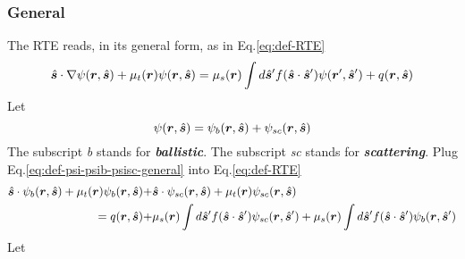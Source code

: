 \documentclass [10pt,letterpaper]{article}
\newcommand{\unitvectorsym}[1]{\hat{\vectorsym{#1}}}
\begin{document}
\subsubsection{General}
\label{subsub:extracting-psib-general}
The RTE reads, in its general form, as in Eq.\eqref{eq:def-RTE}
\begin{equation*}
	\unitvectorsym{s}\cdot\nabla\psi(\vectorsym{r},\unitvectorsym{s})
	+\mu_t(\vectorsym{r})\psi(\vectorsym{r},\unitvectorsym{s})
	=
	\mu_s(\vectorsym{r})
	\int d\unitvectorsym{s}^\prime
	f(\unitvectorsym{s}\cdot\unitvectorsym{s}^\prime)
	\psi(\vectorsym{r^\prime},\unitvectorsym{s}^\prime)
	+q(\vectorsym{r},\unitvectorsym{s})
\end{equation*}
Let
\begin{equation} \label{eq:def-psi-psib-psisc-general}
	\psi(\vectorsym{r},\unitvectorsym{s})
	=
	\psi_b(\vectorsym{r},\unitvectorsym{s})
	+\psi_{sc}(\vectorsym{r},\unitvectorsym{s})
\end{equation}
The subscript \emph{b} stands for \emph{\bf ballistic}.
The subscript \emph{sc} stands for \emph{\bf scattering}.
Plug Eq.\eqref{eq:def-psi-psib-psisc-general} into Eq.\eqref{eq:def-RTE}
\begin{equation} \label{eq:der-extracting-psib-general-1}
	\begin{split}
		\unitvectorsym{s}
		\cdot
		\psi_b(\vectorsym{r},\unitvectorsym{s})
		+
		\mu_t(\vectorsym{r})
		\psi_b(\vectorsym{r},\unitvectorsym{s})
		+&
		\unitvectorsym{s}
		\cdot
		\psi_{sc}(\vectorsym{r},\unitvectorsym{s})
		+
		\mu_t(\vectorsym{r})
		\psi_{sc}(\vectorsym{r},\unitvectorsym{s})
		\\
		=
		q(\vectorsym{r},\unitvectorsym{s})
		+&
		\mu_s(\vectorsym{r})
		\int d\unitvectorsym{s}^\prime
		f(\unitvectorsym{s}\cdot\unitvectorsym{s}^\prime)
		\psi_{sc}(\vectorsym{r},\unitvectorsym{s}^\prime) 
		+ 
		\mu_s(\vectorsym{r})
		\int d\unitvectorsym{s}^\prime
		f(\unitvectorsym{s}\cdot\unitvectorsym{s}^\prime)
		\psi_{b}(\vectorsym{r},\unitvectorsym{s}^\prime) 
	\end{split}
\end{equation}
Let
\end{document}
